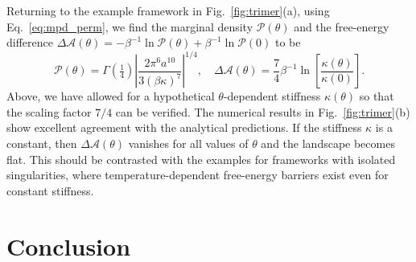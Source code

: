 Returning to the example framework in Fig.~\ref{fig:trimer}(a), using Eq.~\eqref{eq:mpd_perm}, we find the marginal density $\mathscr{P}(\theta)$ and the free-energy difference $\Delta\mathscr{A}(\theta) = -\beta^{-1}\ln\mathscr{P}(\theta) + \beta^{-1}\ln\mathscr{P}(0)$ to be
%
\begin{equation}
  \mathscr{P}(\theta) = \Gamma\left(\tfrac{1}{4}\right)\left|\frac{2\pi^{6}a^{10}}{3(\beta\kappa)^{7}}\right|^{1/4},
  \quad
  \Delta\mathscr{A}(\theta) = \frac{7}{4}\beta^{-1}\ln\left[\frac{\kappa(\theta)}{\kappa(0)}\right].
  \label{eq:trimer_free}
\end{equation}
%
Above, we have allowed for a hypothetical $\theta$-dependent stiffness $\kappa(\theta)$ so that the scaling factor $7/4$ can be verified.
The numerical results in Fig.~\ref{fig:trimer}(b) show excellent agreement with the analytical predictions.
If the stiffness $\kappa$ is a constant, then $\Delta\mathscr{A}(\theta)$ vanishes for all values of $\theta$ and the landscape becomes flat.
This should be contrasted with the examples for frameworks with isolated singularities, where temperature-dependent free-energy barriers exist even for constant stiffness.


\section{Conclusion}

